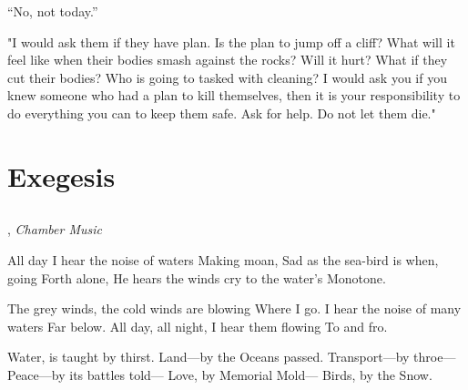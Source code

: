 \documentclass[12pt, letterpaper]{report}
\begin{document}
\vspace{1\baselineskip}
``No, not today.''

\vspace{1\baselineskip}
"I would ask them if they have plan. Is the plan to jump off a cliff? What will it feel like when their bodies smash against the rocks? Will it hurt? What if they cut their bodies? Who is going to tasked with cleaning? I would ask you if you knew someone who had a plan to kill themselves, then it is your responsibility to do everything you can to keep them safe. Ask for help. Do not let them die."

\part{Exegesis}

\chapter{}


\author{James Joyce}, \textit{Chamber Music}

\begin{poem}
\begin{stanza}
All day I hear the noise of waters\verseline
Making moan,\verseline
Sad as the sea-bird is when, going\verseline
Forth alone,\verseline
He hears the winds cry to the water’s\verseline
Monotone.
\end{stanza}
\begin{stanza}
The grey winds, the cold winds are blowing\verseline
Where I go.\verseline
I hear the noise of many waters\verseline
Far below.\verseline
All day, all night, I hear them flowing\verseline
To and fro.
\end{stanza}
\end{poem}

\clearpage

\author{Emily Dickinson}

\begin{poem}
\begin{stanza}
Water, is taught by thirst.\verseline
Land---by the Oceans passed.\verseline
Transport---by throe---\verseline
Peace---by its battles told---\verseline
Love, by Memorial Mold---\verseline
Birds, by the Snow.
\end{stanza}
\end{poem}

\author{Emily Dickinson}
\end{document}
